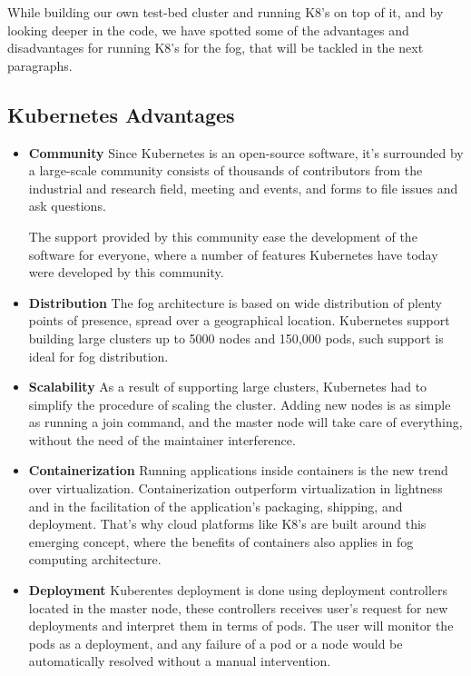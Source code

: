 \documentclass[letterpaper,twocolumn,10pt]{article}
\begin{document}
While building our own test-bed cluster and running K8's on top of it, and by looking deeper in the code, we have spotted some of the advantages and disadvantages for running K8's for the fog, that will be tackled in the next paragraphs.

\subsection{Kubernetes Advantages}
\begin{itemize}

\item{\bf Community} 
Since Kubernetes is an open-source software, it's surrounded by a large-scale community consists of thousands of contributors from the industrial and research field, meeting and events, and forms to file issues and ask questions.

The support provided by this community ease the development of the software for everyone, where a number of features Kubernetes have today were developed by this community.  
\item {\bf Distribution} 
The fog architecture is based on wide distribution of plenty points of presence, spread over a geographical location. Kubernetes support building large clusters up to 5000 nodes and 150,000 pods, such support is ideal for fog distribution. 
\item {\bf Scalability} As a result of supporting large clusters, Kubernetes had to simplify the procedure of scaling the cluster. Adding new nodes is as simple as running a join command, and the master node will take care of everything, without the need of the maintainer interference. 


\item {\bf Containerization} Running applications inside containers is the new trend over virtualization. Containerization outperform virtualization in lightness and in the facilitation of  the application's packaging, shipping, and deployment. That's why cloud platforms like K8's are built around this emerging concept, where the benefits of containers also applies in fog computing architecture.  

\item {\bf Deployment} Kuberentes deployment is done using deployment controllers located in the master node, these controllers receives user's request for new deployments and interpret them in terms of pods. The user will monitor the pods as a deployment, and any failure of a pod or a node would be automatically resolved without a manual intervention. 
\end{itemize}
\end{document}
